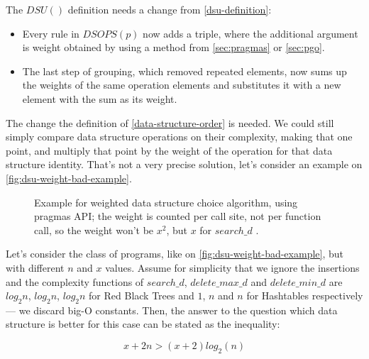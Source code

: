 \documentclass[a4paper,11pt]{article}
\begin{document}
			The $DSU()$ definition needs a change from \autoref{dsu-definition}:

			\begin{itemize}
				\item Every rule in $DSOPS(p)$ now adds a triple, where the additional argument is
					weight obtained by using a method from \autoref{sec:pragmas} or
					\autoref{sec:pgo}.

				\item The last step of grouping, which removed repeated elements, now sums up the weights
					of the same operation elements and substitutes it with a new element with the
					sum as its weight.
			\end{itemize}

            The change the definition of \autoref{data-structure-order} is needed. We could still simply compare data
            structure operations on their complexity, making that one point, and multiply that point by the weight of
            the operation for that data structure identity. That's not a very precise solution, let's consider an
            example on \autoref{fig:dsu-weight-bad-example}.

            \begin{figure}[!h]
                

                \caption{Example for weighted data structure choice algorithm, using pragmas API; the weight is
                counted per call site, not per function call, so the weight won't be $x^2$, but $x$ for $search\_d$ .}

                \label{fig:dsu-weight-bad-example}
            \end{figure}

            Let's consider the class of programs, like on \autoref{fig:dsu-weight-bad-example}, but with different $n$
            and $x$ values. Assume for simplicity that we ignore the insertions and the complexity functions of $search\_d$,
            $delete\_max\_d$ and $delete\_min\_d$ are $log_2 n$, $log_2 n$, $log_2 n$ for Red Black Trees and $1$, $n$ and $n$
            for Hashtables respectively --- we discard big-O constants. Then, the answer to the question which data structure 
            is better for this case can be stated as the inequality:

            \begin{equation}
                x + 2n > (x + 2)log_2(n)
            \end{equation}
            
\end{document}
